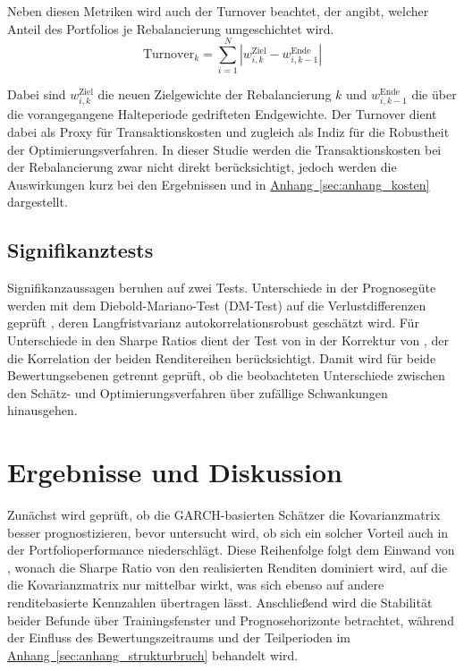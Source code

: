 \documentclass[a4paper, 12pt]{article}
\begin{document}
Neben diesen Metriken wird auch der Turnover beachtet, der angibt, welcher Anteil des Portfolios je Rebalancierung umgeschichtet wird.
\begin{equation}
	\mathrm{Turnover}_k = \sum_{i=1}^{N}\left| w_{i,k}^{\mathrm{Ziel}} - w_{i,k-1}^{\mathrm{Ende}} \right|
	\label{eq:turnover}
\end{equation}

Dabei sind $w_{i,k}^{\mathrm{Ziel}}$ die neuen Zielgewichte der Rebalancierung $k$ und $w_{i,k-1}^{\mathrm{Ende}}$ die über die vorangegangene Halteperiode gedrifteten Endgewichte.
Der Turnover dient dabei als Proxy für Transaktionskosten und zugleich als Indiz für die Robustheit der Optimierungsverfahren.
In dieser Studie werden die Transaktionskosten bei der Rebalancierung zwar nicht direkt berücksichtigt, jedoch werden die Auswirkungen kurz bei den Ergebnissen und in \hyperref[sec:anhang_kosten]{Anhang~\ref*{sec:anhang_kosten}} dargestellt.

\subsection{Signifikanztests}
Signifikanzaussagen beruhen auf zwei Tests.
Unterschiede in der Prognosegüte werden mit dem Diebold-Mariano-Test (DM-Test) auf die Verlustdifferenzen geprüft \parencite{diebold1995,west1996}, deren Langfristvarianz autokorrelationsrobust geschätzt wird.
Für Unterschiede in den Sharpe Ratios dient der Test von \textcite{jobson1981} in der Korrektur von \textcite{memmel2003}, der die Korrelation der beiden Renditereihen berücksichtigt.
Damit wird für beide Bewertungsebenen getrennt geprüft, ob die beobachteten Unterschiede zwischen den Schätz- und Optimierungsverfahren über zufällige Schwankungen hinausgehen.

\section{Ergebnisse und Diskussion}\label{sec:ergebnisse}
Zunächst wird geprüft, ob die GARCH-basierten Schätzer die Kovarianzmatrix besser prognostizieren, bevor untersucht wird, ob sich ein solcher Vorteil auch in der Portfolioperformance niederschlägt.
Diese Reihenfolge folgt dem Einwand von \textcite{engle2006}, wonach die Sharpe Ratio von den realisierten Renditen dominiert wird, auf die die Kovarianzmatrix nur mittelbar wirkt, was sich ebenso auf andere renditebasierte Kennzahlen übertragen lässt.
Anschließend wird die Stabilität beider Befunde über Trainingsfenster und Prognosehorizonte betrachtet, während der Einfluss des Bewertungszeitraums und der Teilperioden im \hyperref[sec:anhang_strukturbruch]{Anhang~\ref*{sec:anhang_strukturbruch}} behandelt wird.
\end{document}
